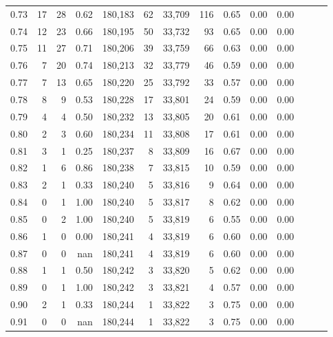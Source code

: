 \begin{tabular}{rrrrrrrrrrrrrr}
0.73 &     17 &     28 &  0.62 &  180,183 &       62 &  33,709 &     116 &  0.65 &  0.00 &      0.00 \\
0.74 &     12 &     23 &  0.66 &  180,195 &       50 &  33,732 &      93 &  0.65 &  0.00 &      0.00 \\
0.75 &     11 &     27 &  0.71 &  180,206 &       39 &  33,759 &      66 &  0.63 &  0.00 &      0.00 \\
0.76 &      7 &     20 &  0.74 &  180,213 &       32 &  33,779 &      46 &  0.59 &  0.00 &      0.00 \\
0.77 &      7 &     13 &  0.65 &  180,220 &       25 &  33,792 &      33 &  0.57 &  0.00 &      0.00 \\
0.78 &      8 &      9 &  0.53 &  180,228 &       17 &  33,801 &      24 &  0.59 &  0.00 &      0.00 \\
0.79 &      4 &      4 &  0.50 &  180,232 &       13 &  33,805 &      20 &  0.61 &  0.00 &      0.00 \\
0.80 &      2 &      3 &  0.60 &  180,234 &       11 &  33,808 &      17 &  0.61 &  0.00 &      0.00 \\
0.81 &      3 &      1 &  0.25 &  180,237 &        8 &  33,809 &      16 &  0.67 &  0.00 &      0.00 \\
0.82 &      1 &      6 &  0.86 &  180,238 &        7 &  33,815 &      10 &  0.59 &  0.00 &      0.00 \\
0.83 &      2 &      1 &  0.33 &  180,240 &        5 &  33,816 &       9 &  0.64 &  0.00 &      0.00 \\
0.84 &      0 &      1 &  1.00 &  180,240 &        5 &  33,817 &       8 &  0.62 &  0.00 &      0.00 \\
0.85 &      0 &      2 &  1.00 &  180,240 &        5 &  33,819 &       6 &  0.55 &  0.00 &      0.00 \\
0.86 &      1 &      0 &  0.00 &  180,241 &        4 &  33,819 &       6 &  0.60 &  0.00 &      0.00 \\
0.87 &      0 &      0 &   nan &  180,241 &        4 &  33,819 &       6 &  0.60 &  0.00 &      0.00 \\
0.88 &      1 &      1 &  0.50 &  180,242 &        3 &  33,820 &       5 &  0.62 &  0.00 &      0.00 \\
0.89 &      0 &      1 &  1.00 &  180,242 &        3 &  33,821 &       4 &  0.57 &  0.00 &      0.00 \\
0.90 &      2 &      1 &  0.33 &  180,244 &        1 &  33,822 &       3 &  0.75 &  0.00 &      0.00 \\
0.91 &      0 &      0 &   nan &  180,244 &        1 &  33,822 &       3 &  0.75 &  0.00 &      0.00 \\

\end{tabular}
